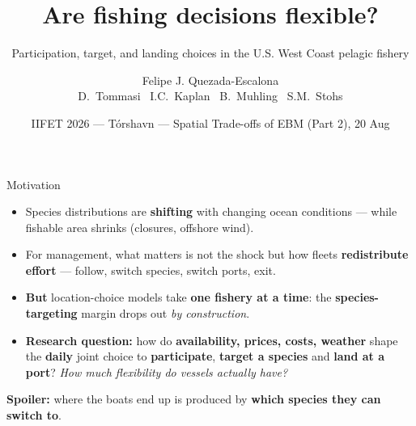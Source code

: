 \documentclass[aspectratio=169,11pt]{beamer}
\title{Are fishing decisions flexible?}
\subtitle{Participation, target, and landing choices in the U.S. West Coast pelagic fishery}
\author{Felipe J. Quezada-Escalona \\ {\scriptsize D.~Tommasi \textbullet\ I.C.~Kaplan \textbullet\ B.~Muhling \textbullet\ S.M.~Stohs}}
\date{IIFET 2026 --- T\'orshavn --- Spatial Trade-offs of EBM (Part 2), 20 Aug}
\newcommand{\takeaway}[1]{\vfill\begin{takeawaybox}\small #1\end{takeawaybox}\vskip2pt}
\begin{document}
{%
  \maketitle
}

\begin{frame}{Motivation}
\begin{itemize}
  \item Species distributions are \textbf{shifting} with changing ocean conditions
        --- while fishable area shrinks (closures, offshore wind).
  \item For management, what matters is not the shock but how fleets
        \textbf{redistribute effort} --- follow, switch species, switch ports, exit.
  \item \textbf{But} location-choice models take \textbf{one fishery at a time}: the
        \textbf{species-targeting} margin drops out \emph{by construction}.
  \item \textbf{Research question:} how do \textbf{availability, prices, costs, weather}
        shape the \textbf{daily} joint choice to \textbf{participate},
        \textbf{target a species} and \textbf{land at a port}?
        \emph{How much flexibility do vessels actually have?}
\end{itemize}
\takeaway{\textbf{Spoiler:} where the boats end up is produced by
\textbf{which species they can switch to}.}
\end{frame}
\end{document}
